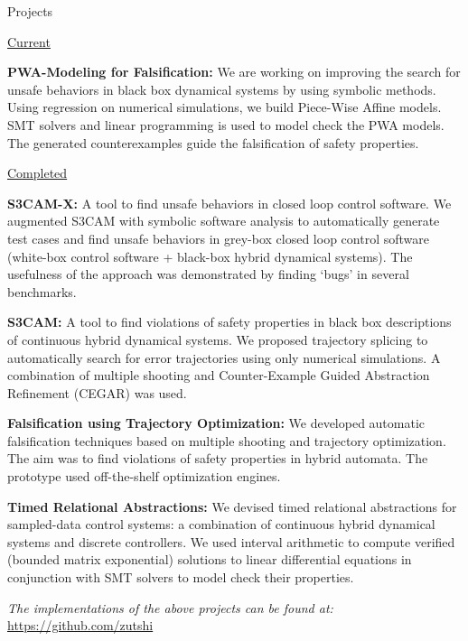 \begin{rSection}{ Projects}

\begin{rSubsection}{\vspace{0.2cm}\hspace{-0.1in}\underline{Current}}{}{}{}
\vspace{0.2cm}
\item
	\textbf{PWA-Modeling for Falsification:} We are working on improving the search for unsafe behaviors in black box dynamical systems by using symbolic methods. Using regression on numerical simulations, we build Piece-Wise Affine models. SMT solvers and linear programming is used to model check the PWA models. The generated counterexamples guide the falsification of safety properties.
\end{rSubsection}
\begin{rSubsection}{\vspace{-0.2cm}\hspace{-0.1in}\underline{Completed}}{}{}{}
\vspace{0.2cm}
  \setlength\itemsep{1em}
\item
	\textbf{S3CAM-X:} A tool to find unsafe behaviors in closed loop control software. We augmented S3CAM with symbolic software analysis to automatically generate test cases and find unsafe behaviors in grey-box closed loop control software (white-box control software + black-box hybrid dynamical systems). The usefulness of the approach was demonstrated by finding `bugs' in several benchmarks.
\item
	\textbf{S3CAM:} A tool to find violations of safety properties in black box descriptions of continuous hybrid dynamical systems. We proposed trajectory splicing to automatically search for error trajectories using only numerical simulations. A combination of multiple shooting and Counter-Example Guided Abstraction Refinement (CEGAR) was used.
\item
	\textbf{Falsification using Trajectory Optimization:} We developed automatic falsification techniques based on multiple shooting and trajectory optimization. The aim was to find violations of safety properties in hybrid automata. The prototype used off-the-shelf optimization engines.
\item
     \textbf{Timed Relational Abstractions:} We devised timed relational abstractions for sampled-data control systems: a combination of continuous hybrid dynamical systems and discrete controllers. We used interval arithmetic to compute verified (bounded matrix exponential) solutions to linear differential equations in conjunction with SMT solvers to model check their properties.
\end{rSubsection}
\vspace{-0.2cm}
\textit{The implementations of the above projects can be found at:} \url{https://github.com/zutshi}

\end{rSection}
